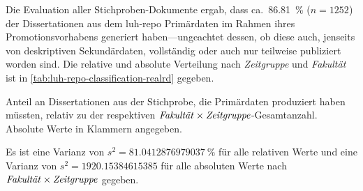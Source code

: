 Die Evaluation aller Stichproben-Dokumente ergab, dass ca.~\SI{86,81}{\percent} ($n=\num{1252}$) der Dissertationen aus dem \gls{luh-repo} Primärdaten im Rahmen ihres Promotionsvorhabens generiert haben---ungeachtet dessen, ob diese auch, jenseits von deskriptiven Sekundärdaten, vollständig oder auch nur teilweise publiziert worden sind.
Die relative und absolute Verteilung nach \textit{Zeitgruppe} und \textit{Fakultät} ist in \cref{tab:luh-repo-classification-realrd} gegeben.
\begin{table}[!htbp]
	\caption{Anteil an Dissertationen aus der Stichprobe, die Primärdaten produziert haben müssten, relativ zu der respektiven $\text{\textit{Fakultät}}\times\text{\textit{Zeitgruppe}}$-Gesamtanzahl.
    Absolute Werte in Klammern angegeben.}
    
    \label{tab:luh-repo-classification-realrd}
\end{table}
Es ist eine Varianz von $s^2=\SI[round-mode=places,round-precision=3]{81.0412876979037}{\percent}$ für alle relativen Werte und eine Varianz von $s^2=\num[round-mode=places,round-precision=3]{1920.15384615385}$ für alle absoluten Werte nach $\text{\textit{Fakultät}}\times\text{\textit{Zeitgruppe}}$ gegeben.

